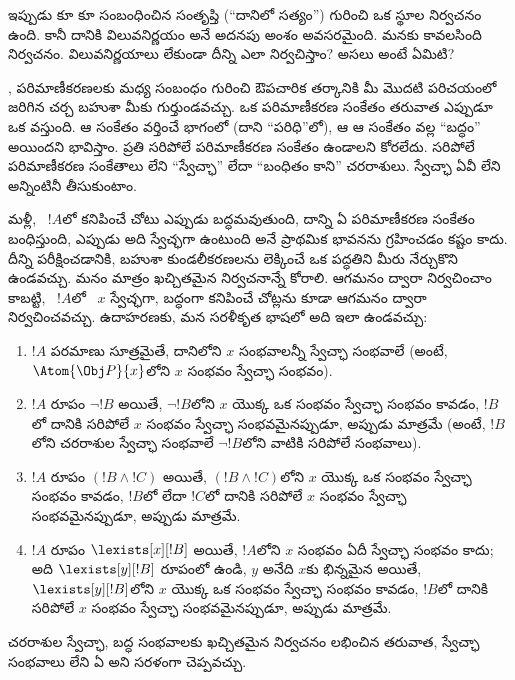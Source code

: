 \documentclass[../../../include/open-logic-section]{subfiles}
\begin{document}


ఇప్పుడు కూ కూ సంబంధించిన సంతృప్తి
(``దానిలో సత్యం'') గురించి ఒక స్థూల నిర్వచనం ఉంది. కానీ దానికి
 విలువనిర్ణయం అనే అదనపు అంశం అవసరమైంది. మనకు కావలసింది
 నిర్వచనం. విలువనిర్ణయాలు లేకుండా దీన్ని ఎలా నిర్వచిస్తాం? అసలు
 అంటే ఏమిటి?

, పరిమాణీకరణలకు మధ్య సంబంధం గురించి ఔపచారిక
తర్కానికి మీ మొదటి పరిచయంలో జరిగిన చర్చ బహుశా మీకు గుర్తుండవచ్చు.
ఒక పరిమాణీకరణ సంకేతం తరువాత ఎప్పుడూ ఒక  వస్తుంది. ఆ
సంకేతం వర్తించే  భాగంలో (దాని ``పరిధి''లో), ఆ
 ఆ సంకేతం వల్ల ``బద్ధం'' అయిందని భావిస్తాం.
 ప్రతి  సరిపోలే పరిమాణీకరణ సంకేతం ఉండాలని
కోరలేదు. సరిపోలే పరిమాణీకరణ సంకేతాలు లేని  ``స్వేచ్ఛా'' లేదా
``బంధితం కాని'' చరరాశులు. స్వేచ్ఛా  ఏవీ లేని 
అన్నింటినీ  తీసుకుంటాం.

మళ్లీ, ~$!A$లో  కనిపించే చోటు ఎప్పుడు
బద్ధమవుతుంది, దాన్ని ఏ పరిమాణీకరణ సంకేతం బంధిస్తుంది, ఎప్పుడు అది స్వేచ్ఛగా ఉంటుంది
అనే ప్రాథమిక భావనను గ్రహించడం కష్టం కాదు. దీన్ని పరీక్షించడానికి,
బహుశా కుండలీకరణలను లెక్కించే ఒక పద్ధతిని మీరు నేర్చుకొని ఉండవచ్చు.
మనం మాత్రం ఖచ్చితమైన నిర్వచనాన్నే కోరాలి.  ఆగమనం
ద్వారా నిర్వచించాం కాబట్టి, ~$!A$లో ~$x$
స్వేచ్ఛగా, బద్ధంగా కనిపించే చోట్లను కూడా ఆగమనం ద్వారా నిర్వచించవచ్చు.
ఉదాహరణకు, మన సరళీకృత భాషలో అది ఇలా ఉండవచ్చు:
\begin{enumerate}
  \item $!A$ పరమాణు సూత్రమైతే, దానిలోని $x$ సంభవాలన్నీ స్వేచ్ఛా
  సంభవాలే (అంటే, $\Atom{\Obj P}{x}$లోని $x$ సంభవం స్వేచ్ఛా సంభవం).
  \item $!A$ రూపం $\lnot !B$ అయితే, $\lnot !B$లోని $x$ యొక్క ఒక
  సంభవం స్వేచ్ఛా సంభవం కావడం, $!B$లో దానికి సరిపోలే $x$ సంభవం
  స్వేచ్ఛా సంభవమైనప్పుడూ, అప్పుడు మాత్రమే (అంటే, $!B$లోని చరరాశుల
  స్వేచ్ఛా సంభవాలే $\lnot !B$లోని వాటికి సరిపోలే సంభవాలు).
  \item $!A$ రూపం $(!B \land !C)$ అయితే, $(!B \land !C)$లోని $x$
  యొక్క ఒక సంభవం స్వేచ్ఛా సంభవం కావడం, $!B$లో లేదా $!C$లో దానికి
  సరిపోలే $x$ సంభవం స్వేచ్ఛా సంభవమైనప్పుడూ, అప్పుడు మాత్రమే.
  \item $!A$ రూపం $\lexists[x][!B]$ అయితే, $!A$లోని $x$ సంభవం ఏదీ
  స్వేచ్ఛా సంభవం కాదు; అది $\lexists[y][!B]$ రూపంలో ఉండి, $y$ అనేది
  $x$కు భిన్నమైన  అయితే, $\lexists[y][!B]$లోని $x$
  యొక్క ఒక సంభవం స్వేచ్ఛా సంభవం కావడం, $!B$లో దానికి సరిపోలే $x$
  సంభవం స్వేచ్ఛా సంభవమైనప్పుడూ, అప్పుడు మాత్రమే.
\end{enumerate}

చరరాశుల స్వేచ్ఛా, బద్ధ సంభవాలకు ఖచ్చితమైన నిర్వచనం లభించిన తరువాత,
స్వేచ్ఛా  సంభవాలు లేని ఏ 
 అని సరళంగా చెప్పవచ్చు.
\end{document}
